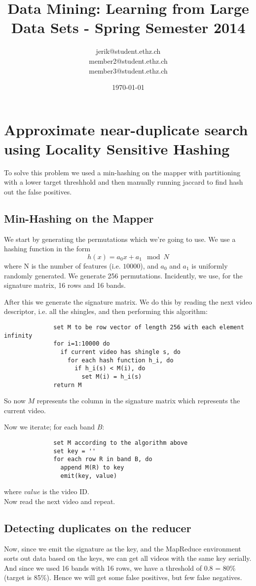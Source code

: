 \documentclass[a4paper, 11pt]{article}
\title{Data Mining: Learning from Large Data Sets - Spring Semester 2014}
\author{jerik@student.ethz.ch\\ member2@student.ethz.ch\\ member3@student.ethz.ch\\}
\date{\today}
\begin{document}
\maketitle

\section{Approximate near-duplicate search using Locality Sensitive Hashing} 
To solve this problem we used a min-hashing on the mapper with partitioning with a lower target threshhold and then manually running jaccard to find hash out the false positives.

	\subsection{Min-Hashing on the Mapper}
		We start by generating the permutations which we're going to use. We use a hashing function in the form
			\[h(x) = a_0x + a_1 \mod N\]
		where N is the number of features (i.e. $10000$), and $a_0$ and $a_1$ is uniformly randomly generated. We generate 256 permutations. Incidently, we use, for the signature matrix, 16 rows and 16 bands.

		After this we generate the signature matrix. We do this by reading the next video descriptor, i.e. all the shingles, and then performing this algorithm:
		\begin{verbatim}
			  set M to be row vector of length 256 with each element infinity
			  for i=1:10000 do
			    if current video has shingle s, do
			      for each hash function h_i, do
			        if h_i(s) < M(i), do
			          set M(i) = h_i(s)
			  return M
		\end{verbatim}
		So now $M$ represents the column in the signature matrix which represents the current video. 

		Now we iterate; for each band $B$:
		\begin{verbatim}
			  set M according to the algorithm above
			  set key = ''
			  for each row R in band B, do
			    append M(R) to key
			    emit(key, value)
		\end{verbatim}

		where $value$ is the video ID.\\
		Now read the next video and repeat.
 		
	\subsection{Detecting duplicates on the reducer}
		Now, since we emit the signature as the key, and the MapReduce environment sorts out data based on the keys, we can get all videos with the same key serially. And since we used 16 bands with 16 rows, we have a threshold of 0.8 = 80\% (target is 85\%). Hence we will get some false positives, but few false negatives.\\
\end{document}
